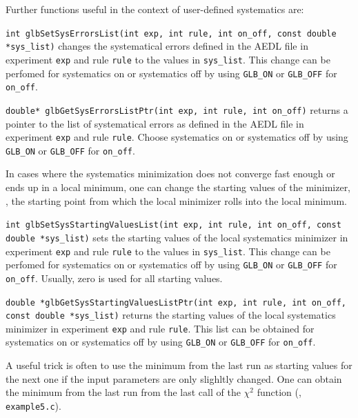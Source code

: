 Further functions useful in the context of user-defined systematics are:
\begin{function}
{\tt int glbSetSysErrorsList(int exp, int rule, int on\_off, const double *sys\_list)}
changes the systematical errors defined in the AEDL file in experiment {\tt exp} and 
rule {\tt rule} to the values in {\tt sys\_list}. This change can be perfomed for
systematics on or systematics off by using {\tt GLB\_ON} or {\tt GLB\_OFF} for {\tt on\_off}. 
\end{function}
\begin{function}
{\tt double* glbGetSysErrorsListPtr(int exp, int rule, int on\_off)}
returns a pointer to the list of systematical errors as defined in the AEDL file in experiment {\tt exp} and 
rule {\tt rule}. Choose
systematics on or systematics off by using {\tt GLB\_ON} or {\tt GLB\_OFF} for {\tt on\_off}. 
\end{function}
In cases where the systematics minimization does not converge fast enough or ends
up in a local minimum, one can change the starting values of the minimizer, \ie, the
starting point from which the local minimizer rolls into the local minimum.
\begin{function}
{\tt int glbSetSysStartingValuesList(int exp, int rule, int on\_off, const double *sys\_list)}
sets the starting values of the local systematics minimizer in experiment {\tt exp} and 
rule {\tt rule} to the values in {\tt sys\_list}. This change can be perfomed for
systematics on or systematics off by using {\tt GLB\_ON} or {\tt GLB\_OFF} for {\tt on\_off}. 
Usually, zero is used for all starting values. 
\end{function}
\begin{function}
{\tt double *glbGetSysStartingValuesListPtr(int exp, int rule, int on\_off, const double *sys\_list)}
returns the starting values of the local systematics minimizer in experiment {\tt exp} and 
rule {\tt rule}. This list can be obtained for
systematics on or systematics off by using {\tt GLB\_ON} or {\tt GLB\_OFF} for {\tt on\_off}.
\end{function}
A useful trick is often to use the minimum from the last run as starting values for the next one
if the input parameters are only slighltly changed. One can obtain the minimum from the last run 
from the last call of the $\chi^2$ function (\cf, {\tt example5.c}).



